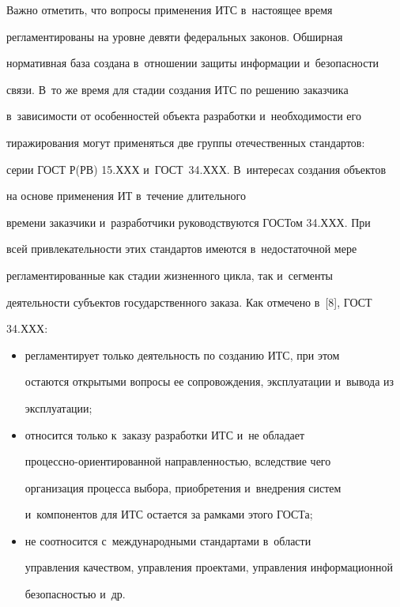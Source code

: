      


     Важно отметить, что вопросы применения ИТС в~настоящее время 


регламентированы на уровне девяти федеральных законов. Обширная 


нормативная база создана в~отношении защиты информации и~безопасности 


связи. В~то же время для стадии создания ИТС по решению заказчика 


в~зависимости от особенностей объекта разработки и~необходимости его 


тиражирования могут применяться две группы отечественных стандартов: 


серии ГОСТ Р(РВ) 15.ХХХ и~ГОСТ~34.ХХХ. В~интересах создания объектов 


на основе применения ИТ в~течение длительного 


времени заказчики и~разработчики руководствуются ГОСТом 34.ХХХ. При 


всей привлекательности этих стандартов имеются в~недостаточной мере 


регламентированные как стадии жизненного цикла, так и~сегменты 


деятельности субъектов государственного заказа. Как отмечено в~[8], ГОСТ 


34.ХХХ:


     \begin{itemize}


     \item регламентирует только деятельность по созданию ИТС, при этом 


остаются открытыми вопросы ее сопровождения, эксплуатации и~вывода из 


эксплуатации;


     \item  относится только к~заказу разработки ИТС и~не обладает  


про\-цес\-сно-ори\-ен\-ти\-ро\-ван\-ной направленностью, вследствие чего 


организация процесса выбора, приобретения и~внедрения систем 


и~компонентов для ИТС остается за рамками этого ГОСТа;


     \item не соотносится с~международными стандартами в~области 


управления качеством, управления проектами, управления информационной 


безопасностью и~др.


     \end{itemize}


